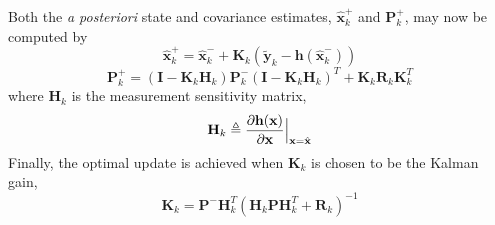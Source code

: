 \documentclass[]{aiaa-tc}%
\begin{document}
Both the \textit{a posteriori} state and covariance estimates, $\hat{\textbf{x}}_k^+$ and $\textbf{P}_k^+$, may now be computed by
%
\begin{equation} \label{eq:xhatplus}
\hat{\textbf{x}}_k^+=\hat{\textbf{x}}_k^-+\textbf{K}_k(\tilde{\textbf{y}}_k-\textbf{h}(\hat{\textbf{x}}_k^-))
\end{equation}
%
\begin{equation} \label{eq:Pplus}
\textbf{P}_k^+=(\textbf{I}-\textbf{K}_k\textbf{H}_k)\textbf{P}_k^-(\textbf{I}-\textbf{K}_k\textbf{H}_k)^T+\textbf{K}_k\textbf{R}_k\textbf{K}_k^T
\end{equation}
%
where $\textbf{H}_k$ is the measurement sensitivity matrix,
%
\begin{equation} \label{eq:Jacobian}
\textbf{H}_k\triangleq\frac{\partial{\textbf{h}(\textbf{x})}}{\partial{\textbf{x}}}\Big{|}_{\textbf{x}=\hat{\textbf{x}}}
\end{equation}
%
Finally, the optimal update is achieved when $\textbf{K}_k$ is chosen to be the Kalman gain, 
%
\begin{equation} \label{eq:K}
\textbf{K}_k=\textbf{P}^-\textbf{H}_k^T(\textbf{H}_k\textbf{P}\textbf{H}_k^T+\textbf{R}_k)^{-1}
\end{equation}
%

\end{document}
